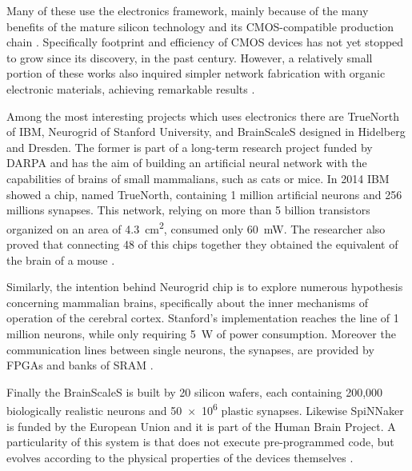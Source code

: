 Many of these use the electronics framework, mainly because of the many benefits of the mature silicon technology and its CMOS-compatible production chain \cite{}.
Specifically footprint and efficiency of CMOS devices has not yet stopped to grow since its discovery, in the past century.
However, a relatively small portion of these works also inquired simpler network fabrication with organic electronic materials, achieving remarkable results \cite{Nawrocki2016a}.

Among the most interesting projects which uses electronics there are TrueNorth of IBM, Neurogrid of Stanford University, and BrainScaleS designed in Hidelberg and Dresden.
The former is part of a long-term research project funded by DARPA and has the aim of building an artificial neural network with the capabilities of brains of small mammalians, such as cats or mice.
In 2014 IBM showed a chip, named TrueNorth, containing 1 million artificial neurons and 256 millions synapses.
This network, relying on more than 5 billion transistors organized on an area of \SI{4.3}{\square\cm}, consumed only \SI{60}{\mW}.
The researcher also proved that connecting 48 of this chips together they obtained the equivalent of the brain of a mouse \cite{Nawrocki2016a}.

Similarly, the intention behind Neurogrid chip is to explore numerous hypothesis concerning mammalian brains, specifically about the inner mechanisms of operation of the cerebral cortex.
Stanford's implementation reaches the line of 1 million neurons, while only requiring \SI{5}{\W} of power consumption.
Moreover the communication lines between single neurons, the synapses, are provided by FPGAs and banks of SRAM \cite{Nawrocki2016a}.

Finally the BrainScaleS is built by 20 silicon wafers, each containing  200,000 biologically realistic neurons and \num{50e6} plastic synapses.
Likewise SpiNNaker is funded by the European Union and it is part of the Human Brain Project.
A particularity of this system is that does not execute pre-programmed code, but evolves according to the physical properties of the devices themselves \cite{HBP.eu}.


